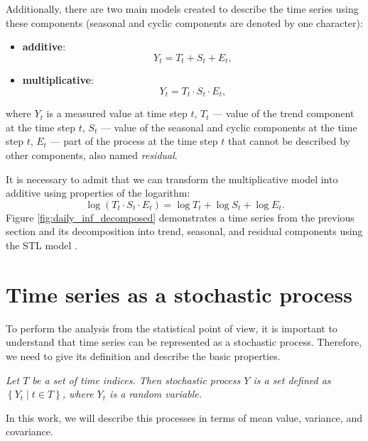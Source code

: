Additionally, there are two main models created to describe the time series using these components (seasonal and cyclic components are denoted by one character):
\begin{itemize}
    \item \textbf{additive}:
    \begin{equation}
        Y_t = T_t + S_t + E_t,
    \label{eq_additive_model}
    \end{equation}
    \item \textbf{multiplicative}:
    \begin{equation}
        Y_t = T_t \cdot S_t \cdot E_t,
    \label{eq_multiplicative_model}
    \end{equation}
\end{itemize}
where $Y_t$ is a measured value at time step $t$, $T_t$ --- value of the trend component at the time step $t$, $S_t$ --- value of the seasonal and cyclic components at the time step $t$, $E_t$ --- part of the process at the time step $t$ that cannot be described by other components, also named \textit{residual}.

It is necessary to admit that we can transform the multiplicative model into additive using properties of the logarithm:
\begin{equation}
    \log (T_t \cdot S_t \cdot E_t) = \log T_t + \log S_t + \log E_t.
\end{equation}
Figure \ref{fig:daily_inf_decomposed} demonstrates a time series from the previous section and its decomposition into trend, seasonal, and residual components using the STL model \cite{cleveland1990stl}.

\section{Time series as a stochastic process}

To perform the analysis from the statistical point of view, it is important to understand that time series can be represented as a stochastic process. Therefore, we need to give its definition and describe the basic properties.

\begin{definition}
\textit{Let $T$ be a set of time indices. Then stochastic process $Y$ is a set defined as $\left\{Y_{t}\;|\;t \in T\right\}$, where $Y_t$ is a random variable.}
\end{definition}
In this work, we will describe this processes in terms of mean value, variance, and covariance.

